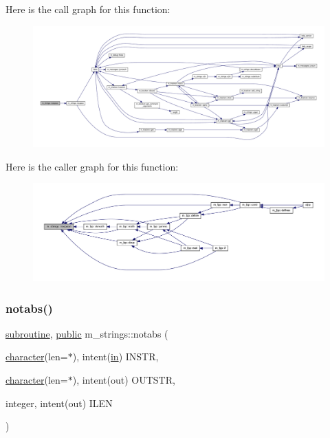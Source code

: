 Here is the call graph for this function\+:
\nopagebreak
\begin{figure}[H]
\begin{center}
\leavevmode
\includegraphics[width=350pt]{namespacem__strings_ad007f050abe3d142f4a7badbc4408685_cgraph}
\end{center}
\end{figure}
Here is the caller graph for this function\+:
\nopagebreak
\begin{figure}[H]
\begin{center}
\leavevmode
\includegraphics[width=350pt]{namespacem__strings_ad007f050abe3d142f4a7badbc4408685_icgraph}
\end{center}
\end{figure}
\mbox{\label{namespacem__strings_a3bf44ac06a670f55830e17a6f1108b9c}} 
\subsubsection{\texorpdfstring{notabs()}{notabs()}}
{\footnotesize\ttfamily \hyperlink{M__stopwatch_83_8txt_acfbcff50169d691ff02d4a123ed70482}{subroutine}, \hyperlink{M__stopwatch_83_8txt_a2f74811300c361e53b430611a7d1769f}{public} m\+\_\+strings\+::notabs (\begin{DoxyParamCaption}\item[{\hyperlink{option__stopwatch_83_8txt_abd4b21fbbd175834027b5224bfe97e66}{character}(len=$\ast$), intent(\hyperlink{M__journal_83_8txt_afce72651d1eed785a2132bee863b2f38}{in})}]{I\+N\+S\+TR,  }\item[{\hyperlink{option__stopwatch_83_8txt_abd4b21fbbd175834027b5224bfe97e66}{character}(len=$\ast$), intent(out)}]{O\+U\+T\+S\+TR,  }\item[{integer, intent(out)}]{I\+L\+EN }\end{DoxyParamCaption})}



